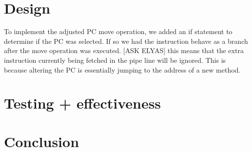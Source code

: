 \documentclass[11pt]{article}
\begin{document}
\section{Design}
To implement the adjusted PC move operation, we added an if statement to determine if the PC was selected. If so we had the instruction behave as a branch after the move operation was executed. [ASK ELYAS] this means that the extra instruction currently being fetched in the pipe line will be ignored. This is because altering the PC is essentially jumping to the address of a new method.

\section{Testing + effectiveness}

\section{Conclusion}
\end{document}
